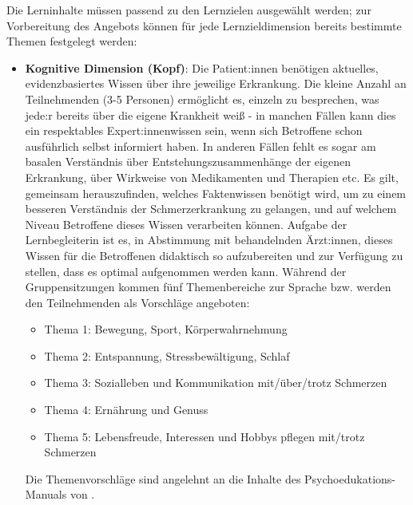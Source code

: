 \documentclass[
  twoside,
  parskip=half-,
]{scrreprt}
\begin{document}
\begin{praxis}
Die Lerninhalte müssen passend zu den Lernzielen ausgewählt werden; zur Vorbereitung des Angebots können für jede Lernzieldimension bereits bestimmte Themen festgelegt werden:
\begin{itemize}
  \item \textbf{Kognitive Dimension (Kopf)}: Die Patient:innen benötigen aktuelles, evidenzbasiertes Wissen über ihre jeweilige Erkrankung. Die kleine Anzahl an Teilnehmenden (3-5 Personen) ermöglicht es, einzeln zu besprechen, was jede:r bereits über die eigene Krankheit weiß - in manchen Fällen kann dies ein respektables Expert:innenwissen sein, wenn sich Betroffene schon ausführlich selbst informiert haben. In anderen Fällen fehlt es sogar am basalen Verständnis über Entstehungszusammenhänge der eigenen Erkrankung, über Wirkweise von Medikamenten und Therapien etc. Es gilt, gemeinsam herauszufinden, welches Faktenwissen benötigt wird, um zu einem besseren Verständnis der Schmerzerkrankung zu gelangen, und auf welchem Niveau Betroffene dieses Wissen verarbeiten können. Aufgabe der Lernbegleiterin ist es, in Abstimmung mit behandelnden Ärzt:innen, dieses Wissen für die Betroffenen didaktisch so aufzubereiten und zur Verfügung zu stellen, dass es optimal aufgenommen werden kann. Während der Gruppensitzungen kommen fünf Themenbereiche zur Sprache bzw. werden den Teilnehmenden als Vorschläge angeboten:
  \begin{itemize}
    \item Thema 1: Bewegung, Sport, Körperwahrnehmung
    \item Thema 2: Entspannung, Stressbewältigung, Schlaf 
    \item Thema 3: Sozialleben und Kommunikation mit/über/trotz Schmerzen
    \item Thema 4: Ernährung und Genuss 
    \item Thema 5: Lebensfreude, Interessen und Hobbys pflegen mit/trotz Schmerzen
  \end{itemize}
  
  Die Themenvorschläge sind angelehnt an die Inhalte des Psychoedukations-Manuals von \citeauthor{wachter}. 


\end{itemize}
\end{praxis}
\end{document}

